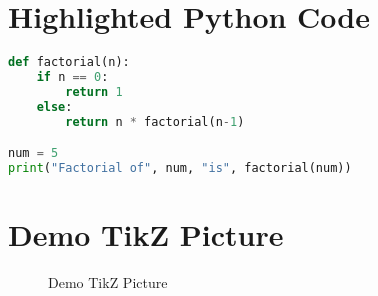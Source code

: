 \documentclass{article}
\begin{document}
\section{Highlighted Python Code}
\lipsum[7]
\begin{lstlisting}[language=Python, caption=Python Code, label=lst:python-code]
def factorial(n):
    if n == 0:
        return 1
    else:
        return n * factorial(n-1)

num = 5
print("Factorial of", num, "is", factorial(num))
\end{lstlisting}


\section{Demo TikZ Picture}
\lipsum[8]
\begin{figure}[h]
	\centering
	\caption{Demo TikZ Picture}
	\label{fig:demo-tikz}
\end{figure}
\lipsum[9-40]
\end{document}
